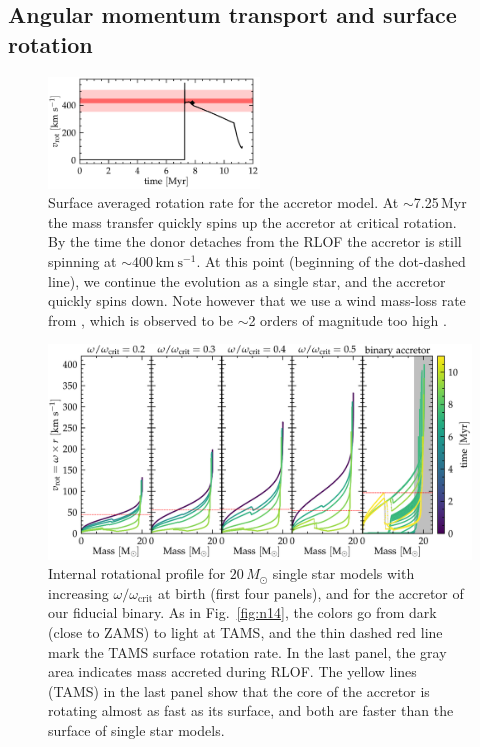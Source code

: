 \documentclass[twocolumn,twocolappendix,trackchanges]{aastex63}
\newcommand{\kms}{{\mathrm{km\ s^{-1}}}}
\DeclareRobustCommand{\Figref}[1]{Fig.~\ref{#1}}
\begin{document}
\subsection{Angular momentum transport and surface rotation}
\label{sec:rot}

\begin{figure}[htbp]
  \includegraphics[width=0.5\textwidth]{zeta_rot}
  \caption{Surface averaged rotation rate for the accretor
    model. At $\sim$7.25\,Myr the mass transfer quickly spins
    up the accretor at critical rotation. By the time the donor
    detaches from the RLOF the accretor is still spinning at
    $\sim$$400\,\kms$. At this point (beginning of the dot-dashed line), we continue the evolution as a single star, and the accretor quickly spins down. Note however that we use a wind mass-loss rate from \cite{vink:01}, which is observed to be
    $\sim$2 orders of magnitude too high \citep{marcolino:09}.}
  \label{fig:surf_rot}
\end{figure}



\begin{figure}[tbp]
  \centering
  \includegraphics[width=\textwidth]{zeta_Rotational_struct}
  \caption{Internal rotational profile for $20\,M_\odot$ single star models with
    increasing $\omega/\omega_\mathrm{crit}$ at birth (first four
    panels), and for the accretor of our fiducial binary. As in
    \Figref{fig:n14}, the colors go from dark (close to ZAMS) to light
    at TAMS, and the thin dashed red line mark the TAMS surface
    rotation rate. In the last panel, the gray area indicates mass
    accreted during RLOF. The yellow lines (TAMS) in the last panel
    show that the core of the accretor is rotating almost as fast as
    its surface, and both are faster than the surface of single star
    models.}
  \label{fig:struct_rot}
\end{figure}
\end{document}
